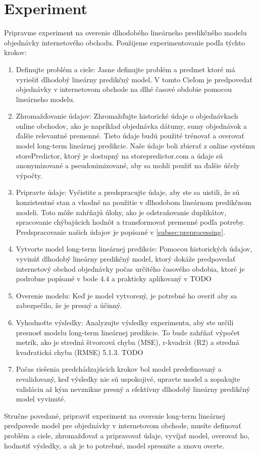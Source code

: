     \section{Experiment}
    Pripravme experiment na overenie dlhodobého lineárneho predikčného modelu objednávky internetového obchodu.
    Použijeme experimentovanie podľa týchto krokov:
    \begin{enumerate}
        \item Definujte problém a ciele: Jasne definujte problém a predmet ktoré má vyriešiť dlhodobý lineárny
        predikčný model. V tomto Cieľom je predpovedať objednávky v internetovom obchode na dlhé časové obdobie
        pomocou lineárneho modelu.
        \item  Zhromažďovanie údajov: Zhromažďujte historické údaje o objednávkach online obchodov, ako je napríklad
        objednávka dátumy, sumy objednávok a ďalšie relevantné premenné. Tieto údaje budú použité trénovať a overovať model
        long-term lineárnej predikcie. Naše údaje boli zbierať z online systému storePredictor, ktorý je dostupný na
        storepredictor.com a údaje sú anonymizované a pseudonimizované, aby sa mohli použiť na ďalšie účely výpočty.
        \item  Pripravte údaje: Vyčistite a predspracujte údaje, aby ste sa uistili, že sú konzistentné stan a vhodné na
        použitie v dlhodobom lineárnom predikčnom modeli. Toto môže zahŕňajú úlohy, ako je odstraňovanie duplikátov,
        spracovanie chýbajúcich hodnôt a transformovať premenné podľa potreby. Predspracovanie našich údajov
        je popísané v \ref{subsec:preprocessing}.
        \item  Vytvorte model long-term lineárnej predikcie: Pomocou historických údajov, vyvinúť dlhodobý lineárny
        predikčný model, ktorý dokáže predpovedať internetový obchod objednávky počas určitého časového obdobia, ktoré
        je podrobne popísané v bode 4.4 a prakticky aplikovaný v TODO
        \item  Overenie modelu: Keď je model vytvorený, je potrebné ho overiť aby sa zabezpečilo, že je presný a účinný.
        \item Vyhodnoťte výsledky: Analyzujte výsledky experimentu, aby ste určili presnosť modelu long-term lineárnej
        predikcie. To bude zahŕňať výpočet metrík, ako je stredná štvorcová chyba (MSE), r-kvadrát (R2) a stredná
        kvadratická chyba (RMSE) 5.1.3. TODO
        \item Počas riešenia predchádzajúcich krokov bol model predefinovaný a revalidovaný, keď výsledky nie sú uspokojivé,
        upravte model a zopakujte validáciu až kým nevznikne presný a efektívny dlhodobý lineárny predikčný model vyvinuté.
    \end{enumerate}
    Stručne povedané, pripraviť experiment na overenie long-term lineárnej predpovede model pre objednávky v
    internetovom obchode, musíte definovať problém a ciele, zhromažďovať a pripravovať údaje, vyvíjať model,
    overovať ho, hodnotiť výsledky, a ak je to potrebné, model spresnite a znovu overte.
